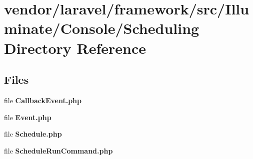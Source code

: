\section{vendor/laravel/framework/src/\+Illuminate/\+Console/\+Scheduling Directory Reference}
\label{dir_65bfec212efede15cb9c1b3260328f60}
\subsection*{Files}
\begin{DoxyCompactItemize}
\item 
file {\bf Callback\+Event.\+php}
\item 
file {\bf Event.\+php}
\item 
file {\bf Schedule.\+php}
\item 
file {\bf Schedule\+Run\+Command.\+php}
\end{DoxyCompactItemize}
